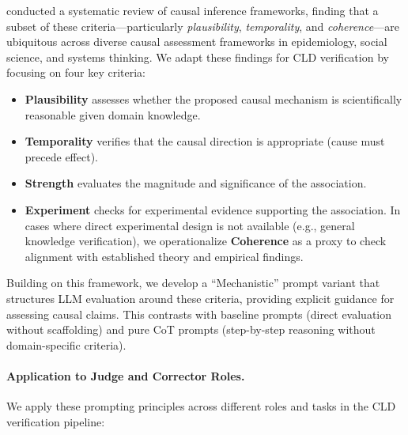 \citet{shimonovich2020bradford} conducted a systematic review of causal inference frameworks, finding that a subset of these criteria---particularly \textit{plausibility}, \textit{temporality}, and \textit{coherence}---are ubiquitous across diverse causal assessment frameworks in epidemiology, social science, and systems thinking. We adapt these findings for CLD verification by focusing on four key criteria:

\begin{itemize}
    \item \textbf{Plausibility} assesses whether the proposed causal mechanism is scientifically reasonable given domain knowledge.
    \item \textbf{Temporality} verifies that the causal direction is appropriate (cause must precede effect).
    \item \textbf{Strength} evaluates the magnitude and significance of the association.
    \item \textbf{Experiment} checks for experimental evidence supporting the association. In cases where direct experimental design is not available (e.g., general knowledge verification), we operationalize \textbf{Coherence} as a proxy to check alignment with established theory and empirical findings.
\end{itemize}

Building on this framework, we develop a ``Mechanistic'' prompt variant that structures LLM evaluation around these criteria, providing explicit guidance for assessing causal claims. This contrasts with baseline prompts (direct evaluation without scaffolding) and pure CoT prompts (step-by-step reasoning without domain-specific criteria).

\paragraph{Application to Judge and Corrector Roles.}

We apply these prompting principles across different roles and tasks in the CLD verification pipeline:

